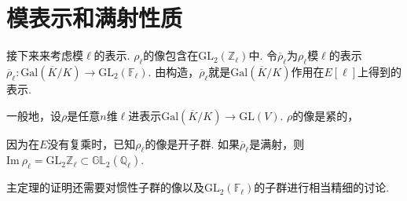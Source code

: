 \section{模表示和满射性质}

接下来来考虑模$\ell$的表示. $\rho_{\ell}$的像包含在$\mathrm{GL}_2(\mathbb{Z}_{\ell})$中.
令$\overline{\rho}_{\ell}$为$\rho_{\ell}$模$\ell$的表示
$\overline{\rho}_{\ell}: \mathrm{Gal}(\overline{K}/K)\to \mathrm{GL}_2(\mathbb{F}_{\ell})$.
由构造，$\overline{\rho}_{\ell}$就是$\mathrm{Gal}(\overline{K}/K)$作用在$E[\ell]$上得到的表示.

一般地，设$\rho$是任意$n$维$\ell$进表示$\mathrm{Gal}(\overline{K}/K)\to \mathrm{GL}(V)$.
$\rho$的像是紧的，

因为在$E$没有复乘时，已知$\rho_{\ell}$的像是开子群. 如果$\overline{\rho}_{\ell}$是满射，则$\mathrm{Im}\ \rho_{\ell} = \mathrm{GL}_2{\mathbb{Z}_{\ell}} \subset \mathbb{GL}_2(\mathbb{Q}_{\ell})$.

主定理的证明还需要对惯性子群的像以及$\mathrm{GL}_2(\mathbb{F}_{\ell})$的子群进行相当精细的讨论.






